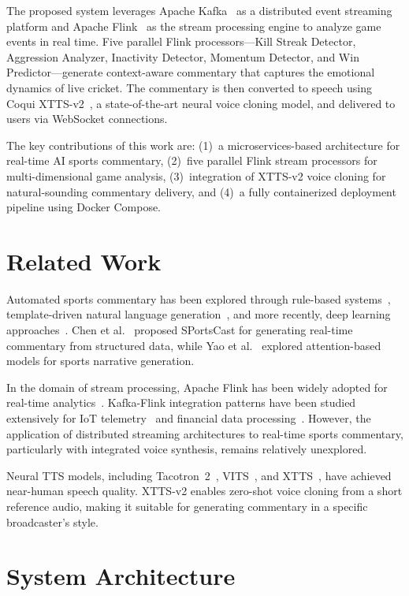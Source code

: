 \documentclass[conference]{IEEEtran}
\begin{document}
The proposed system leverages Apache Kafka~\cite{kafka} as a distributed event streaming platform and Apache Flink~\cite{flink} as the stream processing engine to analyze game events in real time. Five parallel Flink processors---Kill Streak Detector, Aggression Analyzer, Inactivity Detector, Momentum Detector, and Win Predictor---generate context-aware commentary that captures the emotional dynamics of live cricket. The commentary is then converted to speech using Coqui XTTS-v2~\cite{coqui}, a state-of-the-art neural voice cloning model, and delivered to users via WebSocket connections.

The key contributions of this work are: (1)~a microservices-based architecture for real-time AI sports commentary, (2)~five parallel Flink stream processors for multi-dimensional game analysis, (3)~integration of XTTS-v2 voice cloning for natural-sounding commentary delivery, and (4)~a fully containerized deployment pipeline using Docker Compose.

\section{Related Work}

Automated sports commentary has been explored through rule-based systems~\cite{rulebased}, template-driven natural language generation~\cite{nlg}, and more recently, deep learning approaches~\cite{deepcomm}. Chen et al.~\cite{sportscast} proposed SPortsCast for generating real-time commentary from structured data, while Yao et al.~\cite{yao} explored attention-based models for sports narrative generation.

In the domain of stream processing, Apache Flink has been widely adopted for real-time analytics~\cite{flinksurvey}. Kafka-Flink integration patterns have been studied extensively for IoT telemetry~\cite{iot} and financial data processing~\cite{finance}. However, the application of distributed streaming architectures to real-time sports commentary, particularly with integrated voice synthesis, remains relatively unexplored.

Neural TTS models, including Tacotron~2~\cite{tacotron}, VITS~\cite{vits}, and XTTS~\cite{coqui}, have achieved near-human speech quality. XTTS-v2 enables zero-shot voice cloning from a short reference audio, making it suitable for generating commentary in a specific broadcaster's style.

\section{System Architecture}
\end{document}
